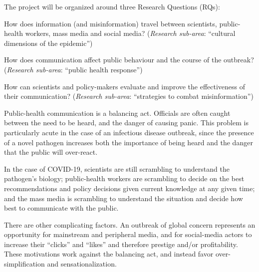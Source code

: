 The project will be organized around three Research Questions (RQs):

 How does information (and misinformation) travel between scientists, public-health workers, mass media and social media? (\emph{Research sub-area}: ``cultural dimensions of the epidemic'') 

 How does communication affect public behaviour and the course of the outbreak? (\emph{Research sub-area}: ``public health response'')  

 How can scientists and policy-makers evaluate and improve the effectiveness of their communication? (\emph{Research sub-area}: ``strategies to combat misinformation'')


Public-health communication is a balancing act. Officials are often caught between the need to be heard, and the danger of causing panic. This problem is particularly acute in the case of an infectious disease outbreak, since the presence of a novel pathogen increases both the importance of being heard and the danger that the public will over-react. 

In the case of COVID-19, scientists are still scrambling to understand the pathogen's biology; public-health workers are scrambling to decide on the best recommendations and policy decisions given current knowledge at any given time; and the mass media is scrambling to understand the situation and decide how best to communicate with the public. 

There are other complicating factors. An outbreak of global concern represents an opportunity for mainstream and peripheral media, and for social-media actors to increase their ``clicks'' and ``likes'' and therefore prestige and/or profitability. These motivations work against the balancing act, and instead favor over-simplification and sensationalization.

